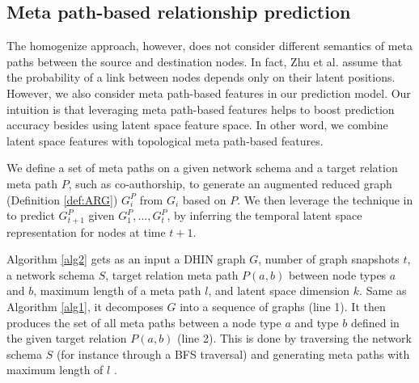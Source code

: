 \subsection{Meta path-based relationship prediction}

The homogenize approach, however, does not consider different semantics of meta paths between the source and destination nodes. In fact, Zhu et al. \cite{Zhu2016} assume that the probability of a link between nodes depends only on their latent positions. However, we also consider meta path-based features in our prediction model. Our intuition is that leveraging meta path-based features \cite{sun2011pathsim} helps to boost prediction accuracy besides using latent space feature space. In other word, we combine latent space features with topological meta path-based features.

We define a set of meta paths \cite{sun2011pathsim} on a given network schema and a target relation meta path $P$, such as co-authorship, to generate an augmented reduced graph (Definition \ref{def:ARG}) $G^P_i$ from $G_i$ based on $P$.  We then leverage the technique in \cite{Zhu2016} to predict $G^P_{t+1}$ given $G^P_1, ..., G^P_t$, by inferring the temporal latent space representation for nodes at time $t+1$.

Algorithm \ref{alg2} gets as an input a DHIN graph $G$, number of graph snapshots $t$, a network schema $S$, target relation meta path $P(a,b)$ between node types $a$ and $b$, maximum length of a meta path $l$, and latent space dimension $k$. Same as Algorithm \ref{alg1}, it decomposes $G$ into a sequence of graphs (line 1). It then produces the set of all meta paths between a node type $a$ and type $b$ defined in the given target relation $P(a,b)$ (line 2). This is done by traversing the network schema $S$ (for instance through a BFS traversal) and generating meta paths with maximum length of $l$ .

